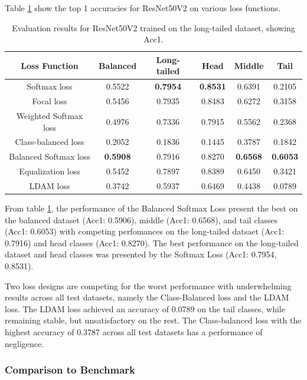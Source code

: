 Table \ref{tab:resnet_lt_acc1_1} show the top 1 accuracies for ResNet50V2 on various loss functions.

\begin{table}[H]
    \centering
    \caption{Evaluation results for ResNet50V2 trained on the long-tailed dataset, showing Acc1.}
    \begin{tabular}{cccccc}
        \toprule
        Loss Function & Balanced & Long-tailed & Head & Middle & Tail \\ 
        \midrule
        Softmax loss   & 0.5522 & \textbf{0.7954} & \textbf{0.8531} & 0.6391 & 0.2105 \\
        Focal loss   & 0.5456 & 0.7935 & 0.8483 & 0.6272 & 0.3158 \\
        Weighted Softmax loss   & 0.4976 & 0.7336 & 0.7915 & 0.5562 & 0.2368 \\
        Class-balanced loss   & 0.2052 & 0.1836 &  0.1445 & 0.3787 & 0.1842 \\
        Balanced Softmax loss   & \textbf{0.5908} & 0.7916 & 0.8270 & \textbf{0.6568} & \textbf{0.6053} \\
        Equalization loss   & 0.5452 & 0.7897 & 0.8389 & 0.6450 & 0.3421 \\
        LDAM loss   & 0.3742 & 0.5937 & 0.6469 & 0.4438 & 0.0789 \\
        \bottomrule
    \end{tabular}
    \label{tab:resnet_lt_acc1_1}
\end{table}



From table \ref{tab:resnet_lt_acc1_1}, the performance of the Balanced Softmax Loss present the best on the balanced dataset (Acc1: 0.5906), middle (Acc1: 0.6568), and tail classes (Acc1: 0.6053) with competing perfomances on the long-tailed datsaet (Acc1: 0.7916) and head classes (Acc1: 0.8270). The best performance on the long-tailed dataset and head classes was presented by the Softmax Loss (Acc1: 0.7954, 0.8531).

Two loss designs are competing for the worst performance with underwhelming results across all test datasets, namely the Class-Balanced loss and the LDAM loss. The LDAM loss achieved an accuracy of 0.0789 on the tail classes, while remaining stable, but unsatisfactory on the rest. The Class-balanced loss with the highest accuracy of 0.3787 across all test datasets has a performance of negligence.

\subsubsection{Comparison to Benchmark}

